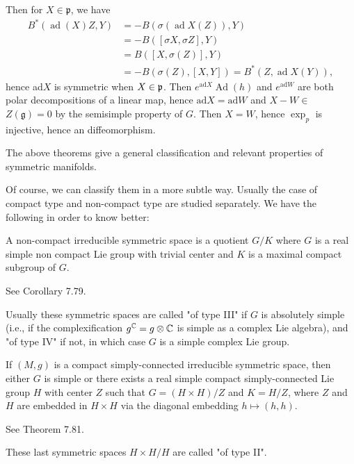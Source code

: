 Then for $X \in \mathfrak{p}$, we have
\[
\begin{aligned}
	B^{*}(\operatorname{ad}(X) Z, Y)
	&=-B(\sigma(\operatorname{ad} X(Z)), Y) \\
	&=-B([\sigma X, \sigma Z], Y) \\
	&=B([X, \sigma(Z)], Y) \\
	&=-B(\sigma(Z),[X, Y])=B^{*}(Z, \operatorname{ad} X(Y)),
\end{aligned}
\]
hence ad$X$ is symmetric when $X \in \mathfrak{{\mathfrak p}}$. Then
$e^{\mathrm{ad} X} \operatorname{Ad}(h)$ and $e^{\mathrm{ad} W}$
are both polar decompositions of a linear map, hence
$\mathrm{ad} X = \mathrm{ad}W$ and $X-W \in$ $Z(\mathfrak{g})=0$
by the semisimple property of $G$. Then $X=W$, hence $\exp _{p}$
is injective, hence an diffeomorphism.
\eproof

The above theorems give  a general classification and relevant
properties of symmetric manifolds.

Of course, we can classify them in a more subtle way. Usually the
case of compact type and non-compact type are studied
separately. We have the following  in order to know better:

\begin{proposition}
	A non-compact irreducible symmetric space is a quotient ${G}
	/ {K}$ where $G$ is a real simple non compact Lie group with
	trivial center and $K$ is a maximal compact subgroup of $G$.
\end{proposition}
\bproof
See \cite{Besse} Corollary 7.79.
\eproof
\begin{remark}
	 Usually these symmetric spaces are called "of type III" if
	 $G$ is absolutely simple (i.e., if the complexification
	 $g^{{\mathbb C}} = g \otimes \mathbb{C}$ is simple as a complex Lie
	 algebra), and "of type IV" if not, in which case $G$ is a
	 simple complex Lie group. 
\end{remark}
\begin{theorem}\label{3}
	If $(M, g)$ is a compact simply-connected irreducible
	symmetric space, then either $G$ is simple or there exists a
	real simple compact simply-connected Lie group $H$ with
	center $Z$ such that $G=(H \times H) / Z$ and $K=H / Z$,
	where $Z$ and $H$ are embedded in $H \times H$ via the
	diagonal embedding $h \mapsto(h, h)$.
\end{theorem}
\bproof
See \cite{Besse} Theorem 7.81.
\eproof
\begin{remark}
	These last symmetric spaces $H \times H / H$ are called "of
	type II". 	
\end{remark}

